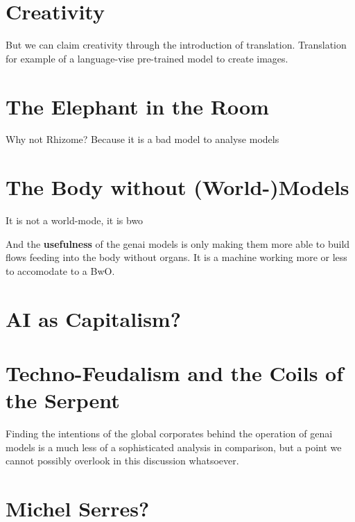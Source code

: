 \section{Creativity}
But we can claim creativity through the introduction of translation.
Translation for example of a language-vise pre-trained model to create images.



\section{The Elephant in the Room}
Why not Rhizome? Because it is a bad model to analyse models

\section{The Body without (World-)Models}
It is not a world-mode, it is \gls{bwo}


And the \textbf{usefulness} of the \gls{genai} models is only making them more
able to build flows feeding into the body without organs. It is a machine
working more or less to accomodate to a BwO.

\section{AI as Capitalism?}


\section{Techno-Feudalism and the Coils of the Serpent}
Finding the intentions of the global corporates behind the operation of \gls{genai} models is a much less of a sophisticated analysis in comparison, but a point
we cannot possibly overlook in this discussion whatsoever.


\section{Michel Serres?}

